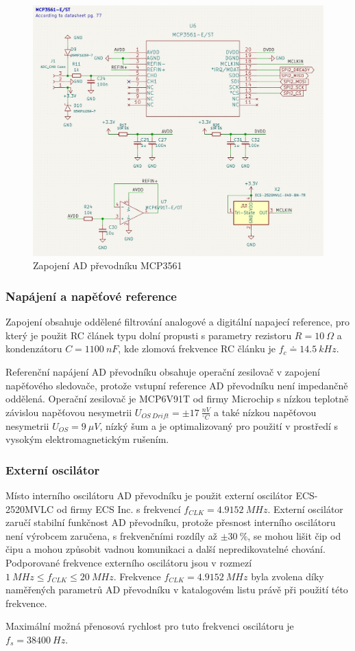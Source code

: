 \begin{figure}[H]
    \centering
    \caption{Zapojení AD převodníku MCP3561}
    \label{fig:mcp3561_connection}
    \includegraphics[width=1\linewidth]{pictures/mcp3561_connection.jpg}
\end{figure}
\subsubsection{Napájení a napěťové reference}
Zapojení obsahuje oddělené filtrování analogové a digitální napajecí reference, pro který je použit RC článek typu dolní propusti s parametry rezistoru $R = 10 \ \Omega$ a kondenzátoru $C = 1100 \ nF$, kde zlomová frekvence RC článku je $f_c \doteq 14.5 \ kHz$.
\par
Referenční napájení AD převodníku obsahuje operační zesilovač v zapojení napěťového sledovače, protože vstupní reference AD převodníku není impedančně oddělená. Operační zesilovač je MCP6V91T od firmy Microchip s nízkou teplotně závislou napěťovou nesymetrii $U_{OS \ Drift} = \pm 17  \ \frac{nV}{^\circ C}$
a také nízkou napěťovou nesymetrii $U_{OS} = 9 \ \mu V$, nízký šum a je optimalizovaný pro použití v prostředí s vysokým elektromagnetickým rušením.

\subsubsection{Externí oscilátor}
Místo interního oscilátoru AD převodníku je použit externí oscilátor ECS-2520MVLC od firmy ECS Inc. s frekvencí $f_{CLK} = 4.9152 \ MHz$. Externí oscilátor zaručí stabilní funkčnost AD převodníku, protože přesnost interního oscilátoru není výrobcem zaručena, s frekvenčními rozdíly až $\pm 30  \ \%$, se mohou lišit čip od čipu a mohou způsobit vadnou komunikaci a další nepredikovatelné chování.
Podporované frekvence externího oscilátoru jsou v rozmezí $ 1 \ MHz \leq  f_{CLK} \leq 20 \ MHz $. Frekvence $f_{CLK} = 4.9152 \ MHz$ byla zvolena díky naměřených parametrů AD převodníku v katalogovém listu právě při použití této frekvence.
\par
Maximální možná přenosová rychlost pro tuto frekvenci oscilátoru je $f_s = 38400 \ Hz$.

